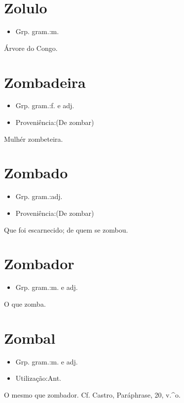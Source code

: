\section{Zolulo}
\begin{itemize}
\item {Grp. gram.:m.}
\end{itemize}
Árvore do Congo.
\section{Zombadeira}
\begin{itemize}
\item {Grp. gram.:f.  e  adj.}
\end{itemize}
\begin{itemize}
\item {Proveniência:(De \textunderscore zombar\textunderscore )}
\end{itemize}
Mulhér zombeteira.
\section{Zombado}
\begin{itemize}
\item {Grp. gram.:adj.}
\end{itemize}
\begin{itemize}
\item {Proveniência:(De \textunderscore zombar\textunderscore )}
\end{itemize}
Que foi escarnecido; de quem se zombou.
\section{Zombador}
\begin{itemize}
\item {Grp. gram.:m.  e  adj.}
\end{itemize}
O que zomba.
\section{Zombal}
\begin{itemize}
\item {Grp. gram.:m.  e  adj.}
\end{itemize}
\begin{itemize}
\item {Utilização:Ant.}
\end{itemize}
O mesmo que \textunderscore zombador\textunderscore . Cf. Castro, \textunderscore Paráphrase\textunderscore , 20, v.^o.

